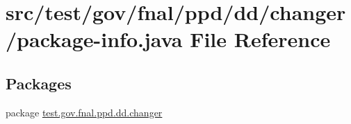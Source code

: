 \hypertarget{test_2gov_2fnal_2ppd_2dd_2changer_2package-info_8java}{\section{src/test/gov/fnal/ppd/dd/changer/package-\/info.java File Reference}
\label{test_2gov_2fnal_2ppd_2dd_2changer_2package-info_8java}
}
\subsection*{Packages}
\begin{DoxyCompactItemize}
\item 
package \hyperlink{namespacetest_1_1gov_1_1fnal_1_1ppd_1_1dd_1_1changer}{test.\-gov.\-fnal.\-ppd.\-dd.\-changer}
\end{DoxyCompactItemize}

